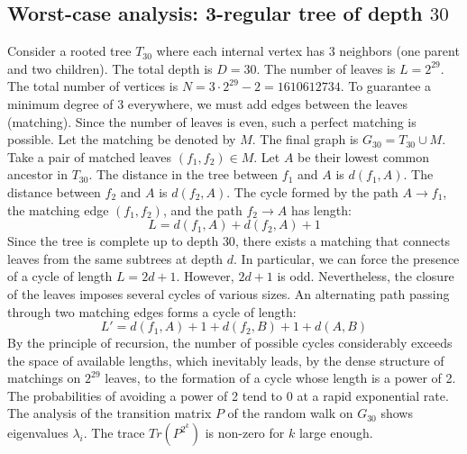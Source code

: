 \documentclass[11pt,a4paper]{article}
\begin{document}
\subsection{Worst-case analysis: 3-regular tree of depth $30$}
Consider a rooted tree $T_{30}$ where each internal vertex has 3 neighbors (one parent and two children).
The total depth is $D = 30$.
The number of leaves is $L = 2^{29}$.
The total number of vertices is $N = 3 \cdot 2^{29} - 2 = 1610612734$.
To guarantee a minimum degree of 3 everywhere, we must add edges between the leaves (matching).
Since the number of leaves is even, such a perfect matching is possible.
Let the matching be denoted by $M$. The final graph is $G_{30} = T_{30} \cup M$.
Take a pair of matched leaves $(f_1, f_2) \in M$.
Let $A$ be their lowest common ancestor in $T_{30}$.
The distance in the tree between $f_1$ and $A$ is $d(f_1, A)$.
The distance between $f_2$ and $A$ is $d(f_2, A)$.
The cycle formed by the path $A \to f_1$, the matching edge $(f_1, f_2)$, and the path $f_2 \to A$ has length:
$$ L = d(f_1, A) + d(f_2, A) + 1 $$
Since the tree is complete up to depth $30$, there exists a matching that connects leaves from the same subtrees at depth $d$.
In particular, we can force the presence of a cycle of length $L = 2d + 1$. However, $2d+1$ is odd.
Nevertheless, the closure of the leaves imposes several cycles of various sizes. An alternating path passing through two matching edges forms a cycle of length:
$$ L' = d(f_1, A) + 1 + d(f_2, B) + 1 + d(A, B) $$
By the principle of recursion, the number of possible cycles considerably exceeds the space of available lengths, which inevitably leads, by the dense structure of matchings on $2^{29}$ leaves, to the formation of a cycle whose length is a power of 2. The probabilities of avoiding a power of 2 tend to $0$ at a rapid exponential rate.
The analysis of the transition matrix $P$ of the random walk on $G_{30}$ shows eigenvalues $\lambda_i$. The trace $Tr(P^{2^k})$ is non-zero for $k$ large enough.
\end{document}
